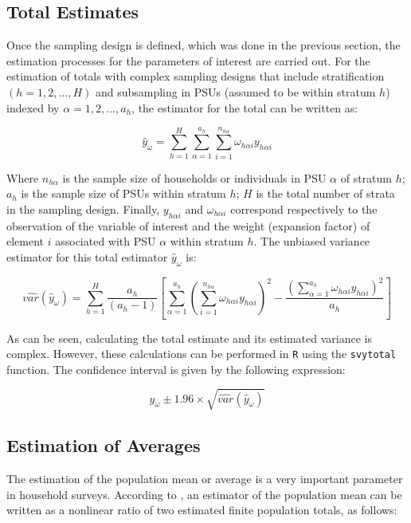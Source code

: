 \documentclass[
  12pt,
]{book}
\begin{document}
\subsection{Total Estimates}\label{total-estimates}

Once the sampling design is defined, which was done in the previous section, the estimation processes for the parameters of interest are carried out. For the estimation of totals with complex sampling designs that include stratification \(\left(h=1,2,...,H\right)\) and subsampling in PSUs (assumed to be within stratum \(h\)) indexed by \(\alpha=1,2,...,a_{h}\), the estimator for the total can be written as:

\[
\hat{y}_{\omega} = \sum_{h=1}^{H}\sum_{\alpha=1}^{a_{h}}\sum_{i=1}^{n_{h\alpha}}\omega_{h\alpha i}y_{h\alpha i}
\]

Where \(n_{h\alpha}\) is the sample size of households or individuals in PSU \(\alpha\) of stratum \(h\); \(a_{h}\) is the sample size of PSUs within stratum \(h\); \(H\) is the total number of strata in the sampling design. Finally, \(y_{h\alpha i}\) and \(\omega_{h\alpha i}\) correspond respectively to the observation of the variable of interest and the weight (expansion factor) of element \(i\) associated with PSU \(\alpha\) within stratum \(h\). The unbiased variance estimator for this total estimator \(\hat{y}_{\omega}\) is:

\[
\widehat{var}\left(\hat{y}_{\omega}\right) = \sum_{h=1}^{H}\frac{a_{h}}{\left(a_{h}-1\right)}\left[\sum_{\alpha=1}^{a_{h}}\left(\sum_{i=1}^{n_{h\alpha}}\omega_{h\alpha i}y_{h\alpha i}\right)^{2}-\frac{\left({ \sum_{\alpha=1}^{a_{h}}}\omega_{h\alpha i}y_{h\alpha i}\right)^{2}}{a_{h}}\right]
\]

As can be seen, calculating the total estimate and its estimated variance is complex. However, these calculations can be performed in \texttt{R} using the \texttt{svytotal} function. The confidence interval is given by the following expression:

\[
\hat{y}_{\omega} \pm 1.96 \times \sqrt{\widehat{var}\left(\hat{y}_{\omega}\right)}
\]

\subsection{Estimation of Averages}\label{estimation-of-averages}

The estimation of the population mean or average is a very important parameter in household surveys. According to \citet{Gutierrez_2016}, an estimator of the population mean can be written as a nonlinear ratio of two estimated finite population totals, as follows:
\end{document}
